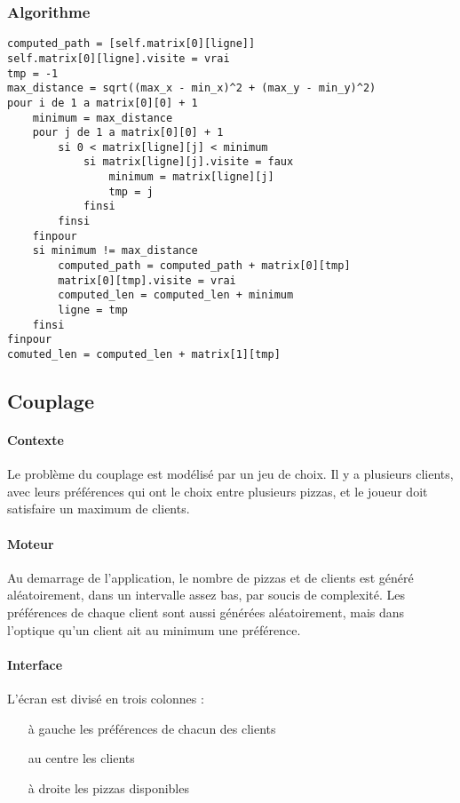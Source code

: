         \subsubsection{Algorithme}
        \begin{lstlisting}
computed_path = [self.matrix[0][ligne]]
self.matrix[0][ligne].visite = vrai
tmp = -1
max_distance = sqrt((max_x - min_x)^2 + (max_y - min_y)^2)
pour i de 1 a matrix[0][0] + 1
    minimum = max_distance
    pour j de 1 a matrix[0][0] + 1
        si 0 < matrix[ligne][j] < minimum
            si matrix[ligne][j].visite = faux
                minimum = matrix[ligne][j]
                tmp = j
            finsi
        finsi
    finpour
    si minimum != max_distance
        computed_path = computed_path + matrix[0][tmp]
        matrix[0][tmp].visite = vrai
        computed_len = computed_len + minimum
        ligne = tmp
    finsi
finpour
comuted_len = computed_len + matrix[1][tmp]
        \end{lstlisting}


	\subsection{Couplage}
		\paragraph{Contexte}
			Le problème du couplage est modélisé par un jeu de choix.
			Il y a plusieurs clients, avec leurs préférences qui ont
			 le choix entre plusieurs pizzas, et le joueur doit
			 satisfaire un maximum de clients.
		\paragraph{Moteur}
			Au demarrage de l'application, le nombre de pizzas et
			 de clients est généré aléatoirement, dans un intervalle
			 assez bas, par soucis de complexité.
			Les préférences de chaque client sont aussi générées aléatoirement,
			 mais dans l'optique qu'un client ait au minimum une préférence.
		\paragraph{Interface}
		    L'écran est divisé en trois colonnes :
		    \begin{itemize}
		        \item[à gauche] les préférences de chacun des clients
		        \item[au centre] les clients
		        \item[à droite] les pizzas disponibles
		    \end{itemize}

